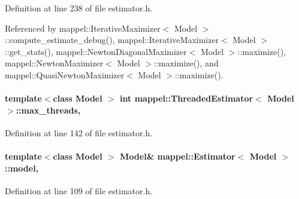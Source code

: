 Definition at line 238 of file estimator.\+h.



Referenced by mappel\+::\+Iterative\+Maximizer$<$ Model $>$\+::compute\+\_\+estimate\+\_\+debug(), mappel\+::\+Iterative\+Maximizer$<$ Model $>$\+::get\+\_\+stats(), mappel\+::\+Newton\+Diagonal\+Maximizer$<$ Model $>$\+::maximize(), mappel\+::\+Newton\+Maximizer$<$ Model $>$\+::maximize(), and mappel\+::\+Quasi\+Newton\+Maximizer$<$ Model $>$\+::maximize().

\paragraph[{\texorpdfstring{max\+\_\+threads}{max_threads}}]{\setlength{\rightskip}{0pt plus 5cm}template$<$class Model $>$ int {\bf mappel\+::\+Threaded\+Estimator}$<$ Model $>$\+::max\+\_\+threads\hspace{0.3cm}{\ttfamily [protected]}, {\ttfamily [inherited]}}\hypertarget{classmappel_1_1ThreadedEstimator_a31391f8aaab3484f58bfdedbdb22be42}{}\label{classmappel_1_1ThreadedEstimator_a31391f8aaab3484f58bfdedbdb22be42}


Definition at line 142 of file estimator.\+h.

\paragraph[{\texorpdfstring{model}{model}}]{\setlength{\rightskip}{0pt plus 5cm}template$<$class Model $>$ Model\& {\bf mappel\+::\+Estimator}$<$ Model $>$\+::model\hspace{0.3cm}{\ttfamily [protected]}, {\ttfamily [inherited]}}\hypertarget{classmappel_1_1Estimator_a8322546d87ccdf01f8b0dcd9dae509f0}{}\label{classmappel_1_1Estimator_a8322546d87ccdf01f8b0dcd9dae509f0}


Definition at line 109 of file estimator.\+h.



